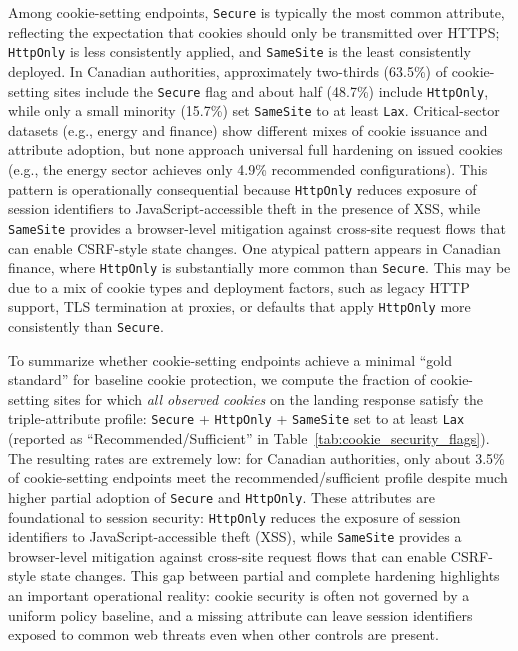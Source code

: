 \documentclass[a4paper,fleqn]{cas-sc}
\begin{document}
    Among cookie-setting endpoints, \texttt{Secure} is typically the most common attribute, reflecting the expectation that cookies should only be transmitted over HTTPS; 
    \texttt{HttpOnly} is less consistently applied, and 
    \texttt{SameSite} is the least consistently deployed. 
    In Canadian authorities, approximately two-thirds (63.5\%) of cookie-setting sites include the \texttt{Secure} flag and about half (48.7\%) include \texttt{HttpOnly}, while only a small minority (15.7\%) set \texttt{SameSite} to at least \texttt{Lax}. 
    Critical-sector datasets (e.g., energy and finance) show different mixes of cookie issuance and attribute adoption, but none approach universal full hardening on issued cookies (e.g., the energy sector achieves only 4.9\% recommended configurations). 
    This pattern is operationally consequential because \texttt{HttpOnly} reduces exposure of session identifiers to JavaScript-accessible theft in the presence of XSS, while \texttt{SameSite} provides a browser-level mitigation against cross-site request flows that can enable CSRF-style state changes. One atypical pattern appears in Canadian finance, where \texttt{HttpOnly} is substantially more common than \texttt{Secure}. This may be due to a mix of cookie types and deployment factors, such as legacy HTTP support, TLS termination at proxies, or defaults that apply \texttt{HttpOnly} more consistently than \texttt{Secure}.

    To summarize whether cookie-setting endpoints achieve a minimal ``gold standard'' for baseline cookie protection, we compute the fraction of cookie-setting sites for which \emph{all observed cookies} on the landing response satisfy the triple-attribute profile: \texttt{Secure} + \texttt{HttpOnly} + \texttt{SameSite} set to at least \texttt{Lax} (reported as ``Recommended/Sufficient'' in Table~\ref{tab:cookie_security_flags}). 
    The resulting rates are extremely low: for Canadian authorities, only about 3.5\% of cookie-setting endpoints meet the recommended/sufficient profile despite much higher partial adoption of \texttt{Secure} and \texttt{HttpOnly}. 
    These attributes are foundational to session security: \texttt{HttpOnly} reduces the exposure of session identifiers to JavaScript-accessible theft (XSS), while \texttt{SameSite} provides a browser-level mitigation against cross-site request flows that can enable CSRF-style state changes.
    This gap between partial and complete hardening highlights an important operational reality: cookie security is often not governed by a uniform policy baseline, and a missing attribute can leave session identifiers exposed to common web threats even when other controls are present.
\end{document}
